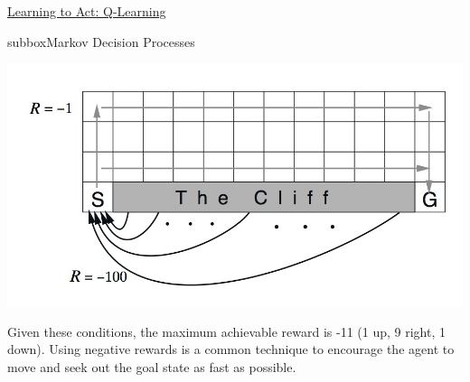 \begin{textbox}{\href{https://compneuro.neuromatch.io/tutorials/W3D4_ReinforcementLearning/student/W3D4_Tutorial3.html}{Learning to Act: Q-Learning } }
\begin{subbox}{subbox}{Markov Decision Processes}
\begin{center}
    
\includegraphics[scale=0.14]{Figures/RL/RL_Figure14.png}
\end{center}

Given these conditions, the maximum achievable reward is -11 (1 up, 9 right, 1 down). Using negative rewards is a common technique to encourage the agent to move and seek out the goal state as fast as possible.

\end{subbox}
\end{textbox}
